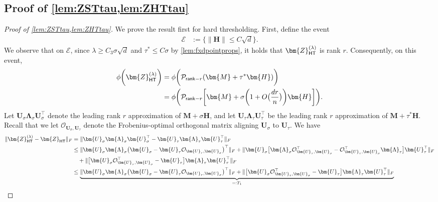 \documentclass[10pt]{article}
\newcommand{\s}{^*}
\renewcommand{\t}{^{\top}}
\theoremstyle{definition}
\begin{document}
 



\subsection{Proof of \cref{lem:ZSTtau,lem:ZHTtau}} \label{sec:ZHTtau}
\begin{proof}[Proof of \cref{lem:ZSTtau,lem:ZHTtau}]
We prove the result first for hard thresholding.
 First, define the event
    \begin{align}
        \mathcal{E} 
        &:= \bigg\{ \| \bm{H} \| \leq C \sqrt{d} \bigg\}.
    \end{align}
 We observe that on $\mathcal{E}$, since $\lambda \geq C_3 \sigma \sqrt{d}$ and $\tau\s \leq C \sigma$ by \cref{lem:fxdpointprops}, it holds that $\bm{Z}_{{\sf HT}}^{(\lambda)}$ is rank $r$. Consequently, on this event,
\begin{align}
    \phi\bigg( \bm{Z}_{{\sf HT}}^{(\lambda)} \bigg) &= \phi\bigg( \mathcal{P}_{{\sf rank}-r}(\bm{M} + \tau\s \bm{H} ) \bigg) \\
    &= \phi\bigg( \mathcal{P}_{{\sf rank}-r}\bigg[\bm{M} + \sigma \bigg( 1 + O\big( \frac{dr}{n} \big)\bigg) \bm{H} \bigg] \bigg).
\end{align}
Let $\bm{U}_{\sigma} \bm{\Lambda}_{\sigma} \bm{U}_{\sigma}\t$ denote the leading rank $r$ approximation of $\bm{M} + \sigma \bm{H}$, and let $\bm{U}_{\tau} \bm{\Lambda}_{\tau} \bm{U}_{\tau}\t$ be the leading rank $r$ approximation of $\bm{M} + \tau\s \bm{H}$.  Recall that we let $\mathcal{O}_{\bm{U}_{\sigma},\bm{U}_{\tau}}$ denote the Frobenius-optimal orthogonal matrix aligning $\bm{U}_{\sigma}$ to $\bm{U}_{\tau}$.  We have
\begin{align*}
    \| \bm{Z}_{{\sf HT}}^{(\lambda)} - \bm{Z}_{{\sf HT}} \|_F &= \| \bm{U}_{\sigma} \bm{\Lambda}_{\sigma} \bm{U}_{\sigma}\t - \bm{U}_{\tau} \bm{\Lambda}_{\tau} \bm{U}_{\tau}\t \|_F \\
    &\leq \| \bm{U}_{\sigma} \bm{\Lambda}_{\sigma} \big(  \bm{U}_{\sigma} - \bm{U}_{\tau} \mathcal{O}_{\bm{U}_{\tau}, \bm{U}_{\sigma}} \big)\t  \|_F +  \| \bm{U}_{\sigma} \big[ \bm{\Lambda}_{\sigma} \mathcal{O}_{\bm{U}_{\tau},\bm{U}_{\sigma}}\t -  \mathcal{O}_{\bm{U}_{\tau},\bm{U}_{\sigma}}\t  \bm{\Lambda}_{\tau} \big] \bm{U}_{\tau}\t \|_F \\
    &\quad + \| \big[ \bm{U}_{\sigma} \mathcal{O}_{\bm{U}_{\tau},\bm{U}_{\sigma}}\t - \bm{U}_{\tau} \big] \bm{\Lambda}_{\tau} \bm{U}_{\tau}\t \|_F \\
    &\leq \underbrace{\| \bm{U}_{\sigma} \bm{\Lambda}_{\sigma} \big(  \bm{U}_{\sigma} - \bm{U}_{\tau} \mathcal{O}_{\bm{U}_{\tau}, \bm{U}_{\sigma}} \big)\t  \|_F + \| \big[ \bm{U}_{\sigma} \mathcal{O}_{\bm{U}_{\tau},\bm{U}_{\sigma}}\t - \bm{U}_{\tau} \big] \bm{\Lambda}_{\tau} \bm{U}_{\tau}\t \|_F}_{=: T_1} \\

\end{align*}
\end{proof}
\end{document}
